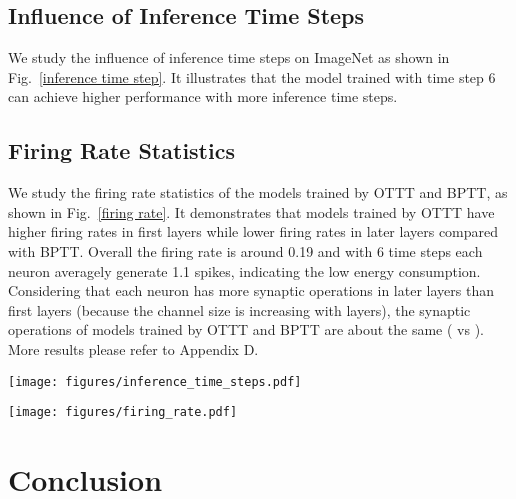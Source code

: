 \documentclass{article}
\begin{document}
\subsection{Influence of Inference Time Steps}
\vspace{-2mm}
We study the influence of inference time steps on ImageNet as shown in Fig.~\ref{inference time step}. It illustrates that the model trained with time step 6 can achieve higher performance with more inference time steps.

\subsection{Firing Rate Statistics}
\vspace{-2mm}
We study the firing rate statistics of the models trained by OTTT and BPTT, as shown in Fig.~\ref{firing rate}. It demonstrates that models trained by OTTT have higher firing rates in first layers while lower firing rates in later layers compared with BPTT. Overall the firing rate is around 0.19 and with 6 time steps each neuron averagely generate 1.1 spikes, indicating the low energy consumption. Considering that each neuron has more synaptic operations in later layers than first layers (because the channel size is increasing with layers), the synaptic operations of models trained by OTTT and BPTT are about the same ( vs ). More results please refer to Appendix D.

\begin{minipage}{0.48\linewidth}
	\centering
	\small
	\texttt{[image: figures/inference\_time\_steps.pdf]}
	\label{inference time step}
\end{minipage}
\hspace{4mm}
\begin{minipage}{0.48\linewidth}
	\centering
	\small
	\texttt{[image: figures/firing\_rate.pdf]}
	\label{firing rate}
\end{minipage}


\section{Conclusion}
\vspace{-2mm}
\end{document}
